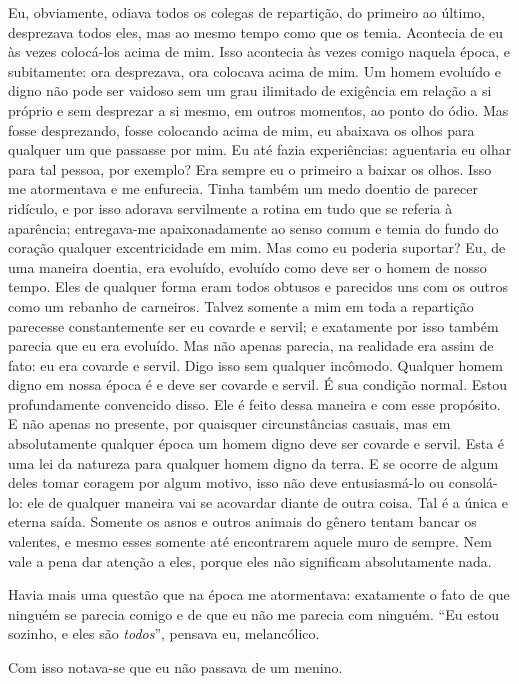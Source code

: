 Eu, obviamente, odiava todos os colegas de repartição, do primeiro ao
último, desprezava todos eles, mas ao mesmo tempo como que os temia.
Acontecia de eu às vezes colocá-los acima de mim. Isso acontecia às
vezes comigo naquela época, e subitamente: ora desprezava, ora colocava
acima de mim. Um homem evoluído e digno não pode ser vaidoso sem um
grau ilimitado de exigência em relação a si próprio e sem desprezar a
si mesmo, em outros momentos, ao ponto do ódio. Mas fosse desprezando,
fosse colocando acima de mim, eu abaixava os olhos para qualquer um que
passasse por mim. Eu até fazia experiências: aguentaria eu olhar para
tal pessoa, por exemplo? Era sempre eu o primeiro a baixar os olhos.
Isso me atormentava e me enfurecia. Tinha também um medo doentio de
parecer ridículo, e por isso adorava servilmente a rotina em tudo que
se referia à aparência; entregava-me apaixonadamente ao senso comum e
temia do fundo do coração qualquer excentricidade em mim. Mas como eu
poderia suportar? Eu, de uma maneira doentia, era evoluído, evoluído
como deve ser o homem de nosso tempo. Eles de qualquer forma eram todos
obtusos e parecidos uns com os outros como um rebanho de carneiros.
Talvez somente a mim em toda a repartição parecesse constantemente ser
eu covarde e servil; e exatamente por isso também parecia que eu
era evoluído. Mas não apenas parecia, na realidade era assim de fato:
eu era covarde e servil. Digo isso sem qualquer incômodo. Qualquer
homem digno em nossa época é e deve ser covarde e servil. É sua
condição normal. Estou profundamente convencido disso. Ele é feito
dessa maneira e com esse propósito. E não apenas no presente, por
quaisquer circunstâncias casuais, mas em absolutamente qualquer época
um homem digno deve ser covarde e servil. Esta é uma lei da natureza
para qualquer homem digno da terra. E se ocorre de algum deles tomar
coragem por algum motivo, isso não deve entusiasmá-lo ou consolá-lo:
ele de qualquer maneira vai se acovardar diante de outra coisa. Tal é a
única e eterna saída. Somente os asnos e outros animais do gênero
tentam bancar os valentes, e mesmo esses somente até encontrarem aquele
muro de sempre. Nem vale a pena dar atenção a eles, porque eles não
significam absolutamente nada.

Havia mais uma questão que na época me atormentava: exatamente o fato de
que ninguém se parecia comigo e de que eu não me parecia com ninguém.
“Eu estou sozinho, e eles são \textit{todos}”, pensava eu, melancólico.

Com isso notava-se que eu não passava de um menino.

